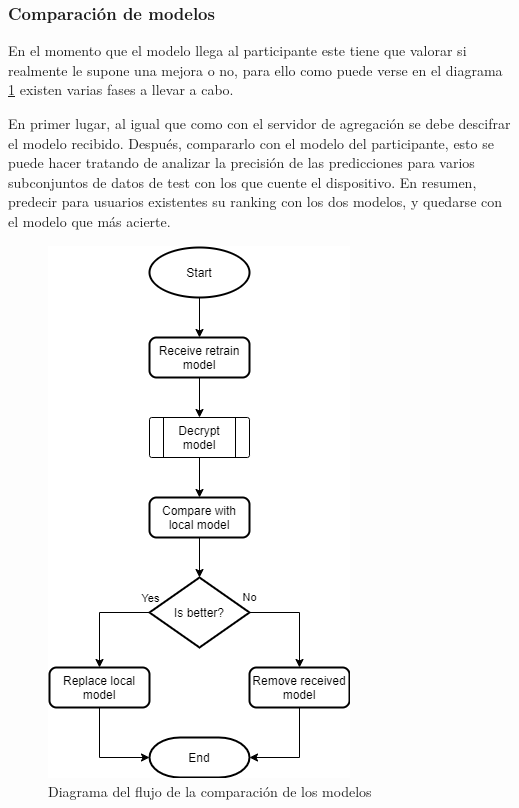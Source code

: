 \subsubsection{Comparación de modelos}
En el momento que el modelo llega al participante este tiene que valorar si realmente le supone una mejora o no, para ello como puede verse en el diagrama \ref{fig:Flow_Compare} existen varias fases a llevar a cabo.

En primer lugar, al igual que como con el servidor de agregación se debe descifrar el modelo recibido. Después, compararlo con el modelo del participante, esto se puede hacer tratando de analizar la precisión de las predicciones para varios subconjuntos de datos de test con los que cuente el dispositivo. En resumen, predecir para usuarios existentes su ranking con los dos modelos, y quedarse con el modelo que más acierte.

\begin{figure}[H]
    \centering
    \includegraphics[height=0.6\textheight]{Figuras/flowchart_compare.png}    
    \caption{Diagrama del flujo de la comparación de los modelos} 
    \label{fig:Flow_Compare}
\end{figure}
